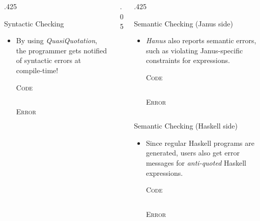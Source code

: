\documentclass[final,hyperref={pdfpagelabels=false}]{beamer}
\newcommand\sepsize{.05\textwidth}
\newcommand\colsize{.425\textwidth}
\newcommand{\code}[2]{
	\begin{center}
		\vspace{.5cm}
		\textsc{\small #1}\\
		\vspace{.5cm}
	\end{center}
	\begin{minipage}{.9\textwidth}
		\inputminted[frame=lines,framesep=1cm,baselinestretch=.8,linenos,fontsize=\footnotesize]
			{haskell}{code/#2.hs}
	\end{minipage}
}
\newcommand{\codeErr}[1]{
	\begin{center}
		\vspace{.5cm}
		\textsc{\small Error}\\
		\vspace{.5cm}
	\end{center}
	\begin{minipage}{.9\textwidth}
		\inputminted[frame=lines,framesep=1cm,baselinestretch=.8,fontsize=\footnotesize]
			{bash}{code/#1_err.hs}
	\end{minipage}
}
\begin{document}
\begin{frame}[t]
\begin{columns}[t]
\begin{column}{\colsize}
\begin{block}{Syntactic Checking}
	\begin{itemize}
	\item By using \textit{QuasiQuotation}, the programmer gets notified of syntactic errors at compile-time!
		\vspace{-.35cm}
		\code{Code}{syntax}
		\vspace{1cm}
		\codeErr{syntax}
	\end{itemize}
\end{block}


\end{column} %

\begin{column}{\sepsize}\end{column} %

\begin{column}{\colsize} %


\begin{block}{Semantic Checking (Janus side)}
	\begin{itemize}
	\item \textit{Hanus} also reports semantic errors, such as violating Janus-specific constraints for expressions.
		\code{Code}{semJ}
		\vspace{1cm}
		\codeErr{semJ}
	\end{itemize}
\end{block}

\begin{block}{Semantic Checking (Haskell side)}
	\begin{itemize}
	\item Since regular Haskell programs are generated, users also get error messages for \textit{anti-quoted} Haskell expressions.
		\code{Code}{semH}
		\vspace{1cm}
		\codeErr{semH}
	\end{itemize}
\end{block}


\end{column}
\end{columns}
\end{frame}
\end{document}
